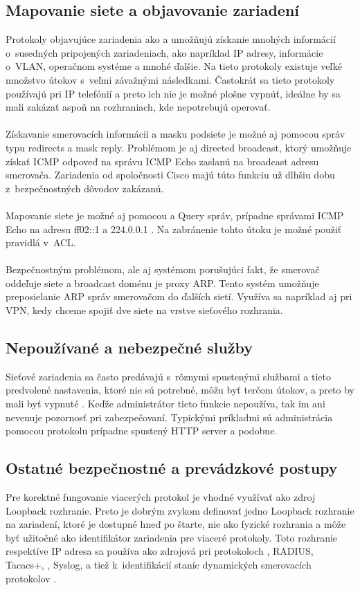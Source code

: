 \subsection{Mapovanie siete a objavovanie zariadení}
Protokoly objavujúce zariadenia ako  a  umožňujú získanie mnohých informácií o~susedných pripojených zariadeniach, ako napríklad IP adresy, informácie o~VLAN, operačnom systéme a mnohé ďalšie. Na tieto protokoly existuje veľké množstvo útokov s~veľmi závažnými následkami. Častokrát sa tieto protokoly používajú pri IP telefónií a preto ich nie je možné plošne vypnúť, ideálne by sa mali zakázať aspoň na rozhraniach, kde nepotrebujú operovať. 
\\\\   
\noindent
Získavanie smerovacích informácií a masku podsiete je možné aj pomocou správ  typu redirects a mask reply. Problémom je aj directed broadcast, ktorý umožňuje získať ICMP odpoveď na správu ICMP Echo zaslanú na broadcast adresu smerovača. Zariadenia od spoločnosti Cisco majú túto funkciu už dlhšiu dobu z~bezpečnostných dôvodov zakázanú. 
\\\\   
\noindent
Mapovanie siete je možné aj pomocou  a  Query správ, prípadne správami ICMP Echo na adresu ff02::1 a 224.0.0.1 \cite{Rey2016}\cite{Podermanski532015}. Na zabránenie tohto útoku je možné použiť pravidlá v~ACL. 
\\\\   
\noindent
Bezpečnostným problémom, ale aj systémom porušujúci fakt, že smerovač oddeľuje siete a broadcast doménu je proxy ARP. Tento systém umožňuje preposielanie ARP správ smerovačom do ďalších sietí. Využíva sa napríklad aj pri VPN, kedy chceme spojiť dve siete na vrstve sieťového rozhrania. 

\subsection{Nepoužívané a nebezpečné služby}
Sieťové zariadenia sa často predávajú s~rôznymi spustenými službami a tieto predvolené nastavenia, ktoré nie sú potrebné, môžu byť terčom útokov, a preto by mali byť vypnuté \cite{CIS_DrTLsgXv24lxeIIM}. Keďže administrátor tieto funkcie nepoužíva, tak im ani nevenuje pozornosť pri zabezpečovaní. Typickými príkladmi sú administrácia pomocou protokolu  prípadne spustený HTTP server a podobne. 

\subsection{Ostatné bezpečnostné a prevádzkové postupy}
Pre korektné fungovanie viacerých protokol je vhodné využívať ako zdroj Loopback rozhranie. Preto je dobrým zvykom definovať jedno Loopback rozhranie na zariadení, ktoré je dostupné hneď po štarte, nie ako fyzické rozhrania a môže byť užitočné ako identifikátor zariadenia pre viaceré protokoly. Toto rozhranie respektíve IP adresa sa používa ako zdrojová pri protokoloch , RADIUS, Tacacs+, , Syslog,  a tiež k~identifikácií staníc dynamických smerovacích protokolov \cite{Jackson2010}\cite{Singh2018}\cite{CIS_DrTLsgXv24lxeIIM}.
